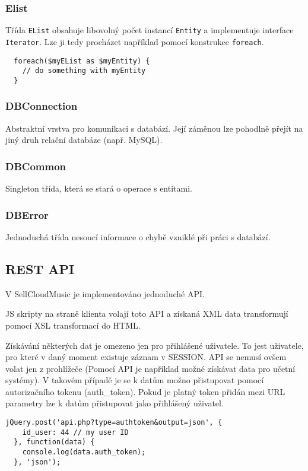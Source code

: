 \documentclass[12pt]{article}
\begin{document}
\subsubsection{Elist}
Třída \verb|EList| obsahuje libovolný počet instancí \verb|Entity| a implementuje interface \verb|Iterator|. Lze ji tedy procházet například pomocí konstrukce \verb|foreach|.

\begin{lstlisting}
  foreach($myEList as $myEntity) {
    // do something with myEntity
  }
\end{lstlisting}

\subsubsection{DBConnection}
Abstraktní vrstva pro komunikaci s databází. Její záměnou lze pohodlně přejít na jiný druh relační databáze (např. MySQL).

\subsubsection{DBCommon}
Singleton třída, která se stará o operace s entitami.

\subsubsection{DBError}
Jednoduchá třída nesoucí informace o chybě vzniklé při práci s databází.

\subsection{REST API}

V SellCloudMusic je implementováno jednoduché API. 

JS skripty na straně klienta volají toto API a získaná XML data transformují pomocí XSL transformací do HTML.

Získávání některých dat je omezeno jen pro přihlášené uživatele. To jest uživatele, pro které v daný moment existuje záznam v SESSION.
API se nemusí ovšem volat jen z prohlížeče (Pomocí API je například možné získávat data pro učetní systémy).
V takovém případě je se k datům možno přistupovat pomocí autorizačního tokenu (auth\_token). Pokud je platný token přidán mezi URL parametry lze k datům přistupovat jako přihlášený uživatel.

\begin{lstlisting}[caption={Volání API pro vygenerování nového autorizačního tokenu}]
  jQuery.post('api.php?type=authtoken&output=json', {
    id_user: 44 // my user ID
  }, function(data) {
    console.log(data.auth_token);
  }, 'json');
\end{lstlisting}
\end{document}
